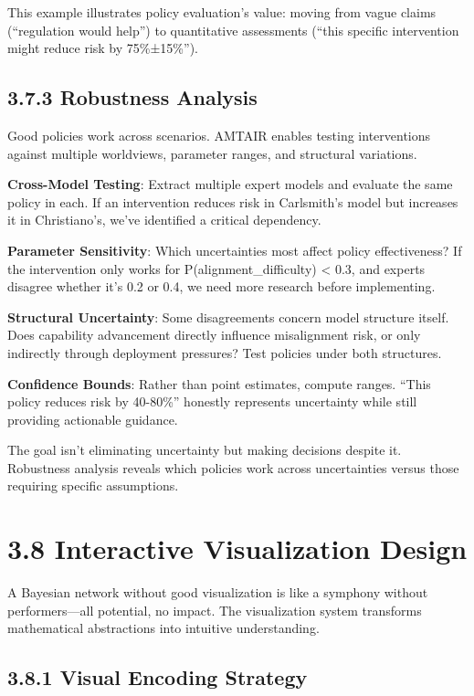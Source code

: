 \documentclass[
  11pt,
  letterpaper,
]{book}
\begin{document}
This example illustrates policy evaluation's value: moving from vague
claims (``regulation would help'') to quantitative assessments (``this
specific intervention might reduce risk by 75\%±15\%'').

\subsection{3.7.3 Robustness Analysis}\label{sec-robustness}

Good policies work across scenarios. AMTAIR enables testing
interventions against multiple worldviews, parameter ranges, and
structural variations.

\textbf{Cross-Model Testing}: Extract multiple expert models and
evaluate the same policy in each. If an intervention reduces risk in
Carlsmith's model but increases it in Christiano's, we've identified a
critical dependency.

\textbf{Parameter Sensitivity}: Which uncertainties most affect policy
effectiveness? If the intervention only works for
P(alignment\_difficulty) \textless{} 0.3, and experts disagree whether
it's 0.2 or 0.4, we need more research before implementing.

\textbf{Structural Uncertainty}: Some disagreements concern model
structure itself. Does capability advancement directly influence
misalignment risk, or only indirectly through deployment pressures? Test
policies under both structures.

\textbf{Confidence Bounds}: Rather than point estimates, compute ranges.
``This policy reduces risk by 40-80\%'' honestly represents uncertainty
while still providing actionable guidance.

The goal isn't eliminating uncertainty but making decisions despite it.
Robustness analysis reveals which policies work across uncertainties
versus those requiring specific assumptions.

\section{3.8 Interactive Visualization
Design}\label{sec-visualization-design}

A Bayesian network without good visualization is like a symphony without
performers---all potential, no impact. The visualization system
transforms mathematical abstractions into intuitive understanding.

\subsection{3.8.1 Visual Encoding Strategy}\label{sec-visual-encoding}
\end{document}
